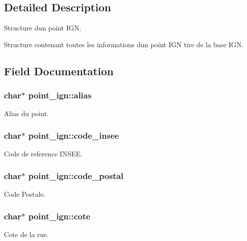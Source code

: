 \subsection{Detailed Description}
Structure d\textquotesingle{}un point I\+GN. 

Structure contenant toutes les informations d\textquotesingle{}un point I\+GN tire de la base I\+GN. 

\subsection{Field Documentation}
\subsubsection[{\texorpdfstring{alias}{alias}}]{\setlength{\rightskip}{0pt plus 5cm}char$\ast$ point\+\_\+ign\+::alias}\hypertarget{structpoint__ign_a6c7451a24f2bd49eb212f1d32ec0bbb5}{}\label{structpoint__ign_a6c7451a24f2bd49eb212f1d32ec0bbb5}
Alias du point. 
\subsubsection[{\texorpdfstring{code\+\_\+insee}{code_insee}}]{\setlength{\rightskip}{0pt plus 5cm}char$\ast$ point\+\_\+ign\+::code\+\_\+insee}\hypertarget{structpoint__ign_ad0a97659d6e223158971c488a5145bf7}{}\label{structpoint__ign_ad0a97659d6e223158971c488a5145bf7}
Code de reference I\+N\+S\+EE. 
\subsubsection[{\texorpdfstring{code\+\_\+postal}{code_postal}}]{\setlength{\rightskip}{0pt plus 5cm}char$\ast$ point\+\_\+ign\+::code\+\_\+postal}\hypertarget{structpoint__ign_a0e02aa443eb7535faef42838dcb5b8e4}{}\label{structpoint__ign_a0e02aa443eb7535faef42838dcb5b8e4}
Code Postale. 
\subsubsection[{\texorpdfstring{cote}{cote}}]{\setlength{\rightskip}{0pt plus 5cm}char$\ast$ point\+\_\+ign\+::cote}\hypertarget{structpoint__ign_a1a4fa8b272ab85c8954aaeaea028a2ab}{}\label{structpoint__ign_a1a4fa8b272ab85c8954aaeaea028a2ab}
Cote de la rue. 
